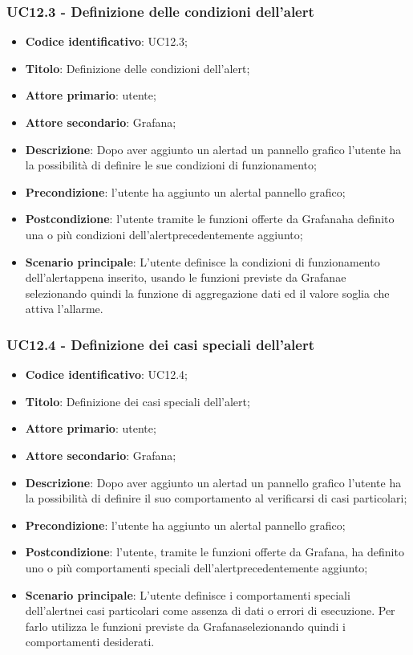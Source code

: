 \subsubsection{UC12.3 - Definizione delle condizioni dell'alert}
\begin{itemize}
	\item \textbf{Codice identificativo}: UC12.3;
	\item \textbf{Titolo}: Definizione delle condizioni dell'alert\glo;
	\item \textbf{Attore primario}: utente;
	\item \textbf{Attore secondario}: Grafana\glo;
	\item \textbf{Descrizione}: Dopo aver aggiunto un alert\glosp ad un pannello grafico l'utente ha la possibilità di definire le sue condizioni di funzionamento;
	\item \textbf{Precondizione}: l'utente ha aggiunto un alert\glosp al pannello grafico;
	\item \textbf{Postcondizione}: l'utente tramite le funzioni offerte da Grafana\glosp ha definito una o più condizioni dell'alert\glosp precedentemente aggiunto;
	\item \textbf{Scenario principale}: L'utente definisce la condizioni di funzionamento dell'alert\glosp appena inserito, usando le funzioni previste da Grafana\glosp e selezionando quindi la funzione di aggregazione dati ed il valore soglia che attiva l'allarme.
\end{itemize}

\subsubsection{UC12.4 - Definizione dei casi speciali dell'alert}
	\begin{itemize}
	\item \textbf{Codice identificativo}: UC12.4;
	\item \textbf{Titolo}: Definizione dei casi speciali dell'alert\glo;
	\item \textbf{Attore primario}: utente;
	\item \textbf{Attore secondario}: Grafana\glo;
	\item \textbf{Descrizione}: Dopo aver aggiunto un alert\glosp ad un pannello grafico l'utente ha la possibilità di definire il suo comportamento al verificarsi di casi particolari;
	\item \textbf{Precondizione}: l'utente ha aggiunto un alert\glosp al pannello grafico;
	\item \textbf{Postcondizione}: l'utente, tramite le funzioni offerte da Grafana\glosp, ha definito uno o più comportamenti speciali dell'alert\glosp precedentemente aggiunto;
	\item \textbf{Scenario principale}: L'utente definisce i comportamenti speciali dell'alert\glosp nei casi particolari come assenza di dati o errori di esecuzione. Per farlo utilizza le funzioni previste da Grafana\glosp selezionando quindi i comportamenti desiderati.
\end{itemize} 
